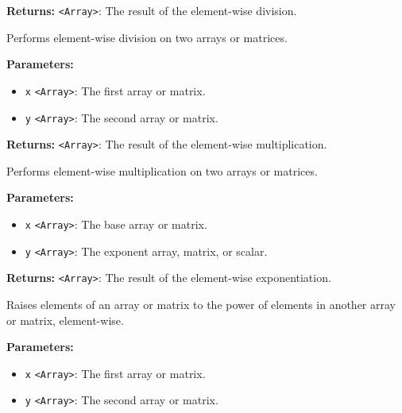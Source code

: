 \documentclass[12pt,a4paper]{article}
\begin{document}
\noindent \textbf{Returns:} \texttt{<Array>}: The result of the element-wise division.

\noindent Performs element-wise division on two arrays or matrices.

\vspace{5mm}
\noindent {}


\noindent \textbf{Parameters:}
\begin{itemize}
  \item \texttt{x} \texttt{<Array>}: The first array or matrix.
  \item \texttt{y} \texttt{<Array>}: The second array or matrix.
\end{itemize}

\noindent \textbf{Returns:} \texttt{<Array>}: The result of the element-wise multiplication.

\noindent Performs element-wise multiplication on two arrays or matrices.

\vspace{5mm}
\noindent {}


\noindent \textbf{Parameters:}
\begin{itemize}
  \item \texttt{x} \texttt{<Array>}: The base array or matrix.
  \item \texttt{y} \texttt{<Array>}: The exponent array, matrix, or scalar.
\end{itemize}

\noindent \textbf{Returns:} \texttt{<Array>}: The result of the element-wise exponentiation.

\noindent Raises elements of an array or matrix to the power of elements in another array or matrix, element-wise.

\vspace{5mm}
\noindent {}


\noindent \textbf{Parameters:}
\begin{itemize}
  \item \texttt{x} \texttt{<Array>}: The first array or matrix.
  \item \texttt{y} \texttt{<Array>}: The second array or matrix.
\end{itemize}
\end{document}
